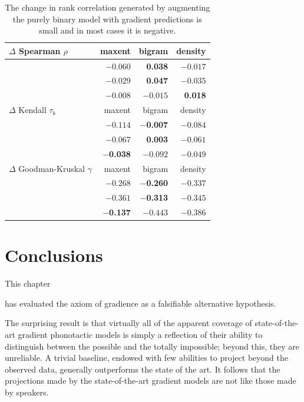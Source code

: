 \begin{table} \centering
\begin{tabular}{l r r r}
\toprule
$\Delta$ Spearman $\rho$          & maxent            & bigram            & density  \\
\midrule
\citealt{Greenberg1964}  & $-0.060$          &  \textbf{0.038} & $-0.017$ \\
\citealt{Scholes1966}    & $-0.029$          &  \textbf{0.047} & $-0.035$ \\
\citealt{Albright2003b}  & $-0.008$          & $-0.015$          & \textbf{0.018} \\
\midrule
$\Delta$ Kendall $\tau_b$         & maxent            & bigram            & density  \\
\midrule
\citealt{Greenberg1964}  & $-0.114$          & \textbf{$-$0.007} & $-0.084$ \\
\citealt{Scholes1966}    & $-0.067$          & \textbf{0.003}  & $-0.061$ \\
\citealt{Albright2003b}  & \textbf{$-$0.038} & $-0.092$          & $-0.049$ \\
\midrule
$\Delta$ Goodman-Kruskal $\gamma$ & maxent            & bigram            & density  \\
\midrule
\citealt{Greenberg1964}  & $-0.268$          & \textbf{$-$0.260} & $-0.337$ \\
\citealt{Scholes1966}    & $-0.361$          & \textbf{$-$0.313} & $-0.345$ \\
\citealt{Albright2003b}  & \textbf{$-$0.137} & $-0.443$          & $-0.386$ \\
\bottomrule
\end{tabular}
\caption{The change in rank correlation generated by augmenting the purely binary model with gradient predictions is small and in most cases it is negative.}
\label{controlled}
\end{table}

\section{Conclusions}

This chapter 

has evaluated the axiom of gradience as a falsifiable alternative hypothesis. 

The surprising result is that virtually all of the apparent coverage of state-of-the-art gradient phonotactic models is simply a reflection of their ability to distinguish between the possible and the totally impossible; beyond this, they are unreliable. A trivial baseline, endowed with few abilities to project beyond the observed data, generally outperforms the state of the art. It follows that the projections made by the state-of-the-art gradient models are not like those made by speakers.

